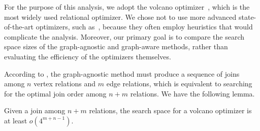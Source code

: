 For the purpose of this analysis, we adopt the volcano optimizer~\cite{columbia}, which is the most widely used relational optimizer. We chose not to use more advanced state-of-the-art optimizers, such as~\cite{Haffnerjoinorder}, because they often employ heuristics that would complicate the analysis. Moreover, our primary goal is to compare the search space sizes of the graph-agnostic and graph-aware methods, rather than evaluating the efficiency of the optimizers themselves.

According to , the graph-agnostic method must produce a sequence of joins among $n$ vertex relations and $m$ edge relations, which is equivalent to searching for the optimal join order among $n + m$ relations. We have the following lemma.

\begin{lemma}
    \label{lem:complexity-of-volcano}
    Given a join among $n + m$ relations, the search space for a volcano optimizer is at least $o(4^{m+n-1})$.
\end{lemma}

